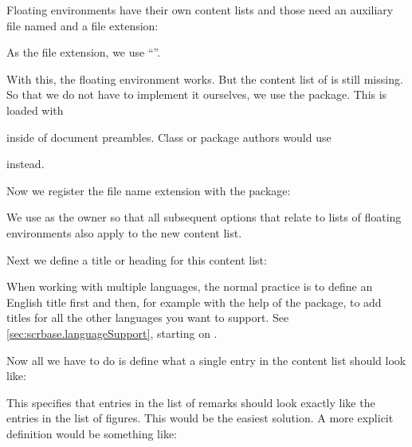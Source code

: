 Floating environments have their own content lists
and those need an auxiliary file named  and a file 
extension:
\begin{lstcode}
  \newcommand*{\ext@remarkbox}{lor}
\end{lstcode}
As the file extension, we use ``''.

With this, the floating environment works. But the content list of 
is still missing. So that we do not have to implement it ourselves, we
use the  package. This is loaded with
\begin{lstcode}
  \usepackage{tocbasic}
\end{lstcode}
inside of document preambles. Class or package authors would use
\begin{lstcode}
  \RequirePackage{tocbasic}
\end{lstcode}
instead.

Now we register the file name extension with the
 package:
\begin{lstcode}
\end{lstcode}
We use  as the owner so that all subsequent \KOMAScript{}
options that relate to lists of floating environments also apply to the new
content list.

Next we define a title or heading for this content list:
\begin{lstcode}
  \newcommand*{\listoflorname}{List of Remarks}
\end{lstcode}
When working with multiple languages, the normal practice is to define an
English title first and then, for example with the help of the
 package, to add titles for all the other languages you want
to support. See \autoref{sec:scrbase.languageSupport}, starting on
.

Now all we have to do is define what a single entry in the
content list should look like:
\begin{lstcode}
  \newcommand*{\l@remarkbox}{\l@figure}
\end{lstcode}
This specifies that entries in the list of remarks should look exactly like the
entries in the list of figures. This would be the easiest solution. A more
explicit definition would be something like:
\begin{lstcode}
\end{lstcode}

